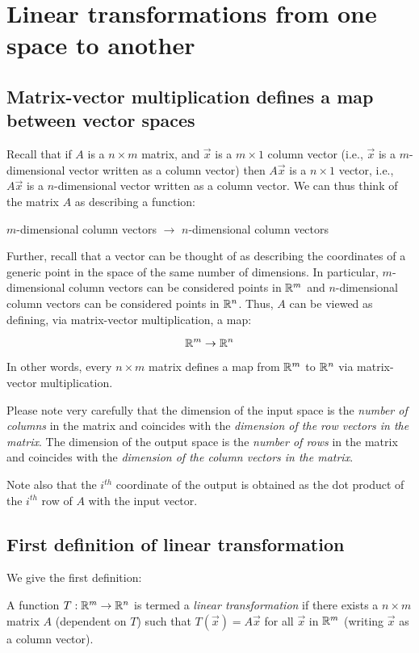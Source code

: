 \documentclass[10pt]{amsart}
\begin{document}
\section{Linear transformations from one space to another}

\subsection{Matrix-vector multiplication defines a map between vector spaces}

Recall that if $A$ is a $n \times m$ matrix, and $\vec{x}$ is a $m
\times 1$ column vector (i.e., $\vec{x}$ is a $m$-dimensional vector
written as a column vector) then $A\vec{x}$ is a $n \times 1$ vector,
i.e., $A\vec{x}$ is a $n$-dimensional vector written as a column
vector. We can thus think of the matrix $A$ as describing a function:

$m$-dimensional column vectors $\to$ $n$-dimensional column vectors

Further, recall that a vector can be thought of as describing the
coordinates of a generic point in the space of the same number of
dimensions. In particular, $m$-dimensional column vectors can be
considered points in $\mathbb{R}^m$ and $n$-dimensional column vectors can be
considered points in $\mathbb{R}^n$. Thus, $A$ can be viewed as defining, via
matrix-vector multiplication, a map:

$$\mathbb{R}^m \to \mathbb{R}^n$$

In other words, every $n \times m$ matrix defines a map from $\mathbb{R}^m$ to
$\mathbb{R}^n$ via matrix-vector multiplication.

Please note very carefully that the dimension of the input space is
the {\em number of columns} in the matrix and coincides with the {\em
  dimension of the row vectors in the matrix}. The dimension of the
output space is the {\em number of rows} in the matrix and coincides
with the {\em dimension of the column vectors in the matrix}.

Note also that the $i^{th}$ coordinate of the output is obtained as
the dot product of the $i^{th}$ row of $A$ with the input vector.

\subsection{First definition of linear transformation}

We give the first definition:

\begin{definer}
  A function $T:\mathbb{R}^m \to \mathbb{R}^n$ is termed a {\em linear transformation}
  if there exists a $n \times m$ matrix $A$ (dependent on $T$) such
  that $T(\vec{x}) = A\vec{x}$ for all $\vec{x}$ in $\mathbb{R}^m$ (writing
  $\vec{x}$ as a column vector).
\end{definer}
\end{document}
